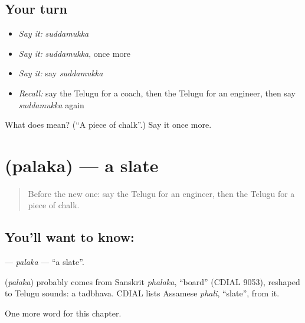 \subsection*{Your turn}
\begin{itemize}
\raggedright
  \item \emph{Say it:} \emph{suddamukka}
  \item \emph{Say it:} \emph{suddamukka}, once more
  \item \emph{Say it:} say \emph{suddamukka}
  \item \emph{Recall:} say the Telugu for a coach, then the Telugu for an engineer, then say \emph{suddamukka} again
\end{itemize}

\begin{tcolorbox}[breakable,colback=teal!4,colframe=teal!35!black,title={Before you move on}]
What does  mean? (\textquotedblleft{}A piece of chalk\textquotedblright{}.) Say it once more.
\end{tcolorbox}
\section[\texorpdfstring{\te{పలక} (palaka)}{పలక (palaka)}]{ (palaka) — a slate}

\label{lesson:TE-C313-palaka}



\begin{quote}
Before the new one: say the Telugu for an engineer, then the Telugu for a piece of chalk.
\end{quote}

\subsection*{You'll want to know: }
\textbf{} — \emph{palaka} — \textquotedblleft{}a slate\textquotedblright{}.

\begin{cousinweb}
\textbf{} (\emph{palaka}) probably comes from Sanskrit \emph{phalaka}, \textquotedblleft{}board\textquotedblright{} (CDIAL 9053), reshaped to Telugu sounds: a tadbhava. CDIAL lists Assamese \emph{phali}, \textquotedblleft{}slate\textquotedblright{}, from it.
\end{cousinweb}

\begin{grammarlens}[title={What you've built}]
One more word for this chapter.
\end{grammarlens}

